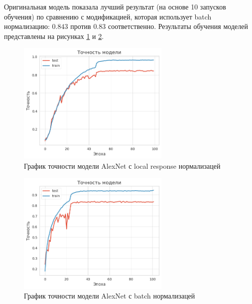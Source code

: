 Оригинальная модель показала лучший результат (на основе 10 запусков обучения) по сравнению с модификацией, которая использует batch нормализацию: $0.843$ против $0.83$ соответственно.
Результаты обучения моделей представлены на рисунках \ref{fig:alexnet_lrn} и \ref{fig:alexnet_bn}.
\begin{figure}[h]
    \centering
    \includegraphics[width=0.65\textwidth]{images/alexnet_lrn_f1.png}
    \caption{График точности модели AlexNet с local response нормализацей}
    \label{fig:alexnet_lrn}
\end{figure}
\begin{figure}[h]
    \centering
    \includegraphics[width=0.65\textwidth]{images/alexnet_bn_f1.png}
    \caption{График точности модели AlexNet с batch нормализацей}
    \label{fig:alexnet_bn}
\end{figure}

